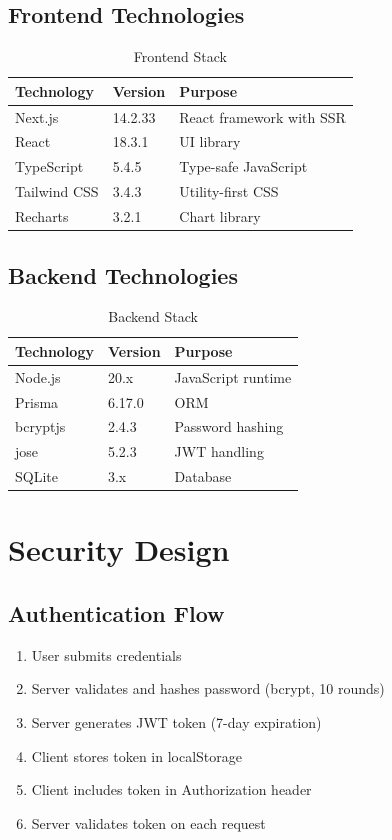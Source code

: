 \subsection{Frontend Technologies}

\begin{table}[H]
\centering
\begin{tabular}{|l|l|p{6cm}|}
\hline
\textbf{Technology} & \textbf{Version} & \textbf{Purpose} \\
\hline
Next.js & 14.2.33 & React framework with SSR \\
React & 18.3.1 & UI library \\
TypeScript & 5.4.5 & Type-safe JavaScript \\
Tailwind CSS & 3.4.3 & Utility-first CSS \\
Recharts & 3.2.1 & Chart library \\
\hline
\end{tabular}
\caption{Frontend Stack}
\end{table}

\subsection{Backend Technologies}

\begin{table}[H]
\centering
\begin{tabular}{|l|l|p{6cm}|}
\hline
\textbf{Technology} & \textbf{Version} & \textbf{Purpose} \\
\hline
Node.js & 20.x & JavaScript runtime \\
Prisma & 6.17.0 & ORM \\
bcryptjs & 2.4.3 & Password hashing \\
jose & 5.2.3 & JWT handling \\
SQLite & 3.x & Database \\
\hline
\end{tabular}
\caption{Backend Stack}
\end{table}

\section{Security Design}

\subsection{Authentication Flow}

\begin{enumerate}
    \item User submits credentials
    \item Server validates and hashes password (bcrypt, 10 rounds)
    \item Server generates JWT token (7-day expiration)
    \item Client stores token in localStorage
    \item Client includes token in Authorization header
    \item Server validates token on each request
\end{enumerate}

